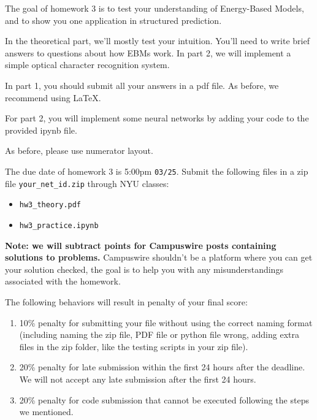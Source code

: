 The goal of homework 3 is to test your understanding of Energy-Based Models, and to show you one application in structured prediction.

In the theoretical part, we'll mostly test your intuition. You'll need to write brief answers to questions about how EBMs work. In part 2, we will implement a simple optical character recognition system. 

In part 1, you should submit all your answers in a pdf file. As before, we recommend using \LaTeX. 

For part 2, you will implement some neural networks by adding your code to the provided ipynb file.

As before, please use numerator layout.

The due date of homework 3 is 5:00pm \texttt{03/25}.
Submit the following files in a zip file \texttt{your\_net\_id.zip} through NYU classes:
\begin{itemize}
\item \texttt{hw3\_theory.pdf}
\item \texttt{hw3\_practice.ipynb}
\end{itemize}

\textbf{Note: we will subtract points for Campuswire posts containing solutions to problems.} Campuswire shouldn't be a platform where you can get your solution checked, the goal is to help you with any misunderstandings associated with the homework.

The following behaviors will result in penalty of your final score:
\begin{enumerate}
\item 10\% penalty for submitting your file without using the correct naming format (including naming the zip file, PDF file or python file wrong, adding extra files in the zip folder, like the testing scripts in your zip file). 
\item 20\% penalty for late submission within the first 24 hours after the deadline. We will not accept any late submission after the first 24 hours.
\item 20\% penalty for code submission that cannot be executed following the steps we mentioned.
\end{enumerate}